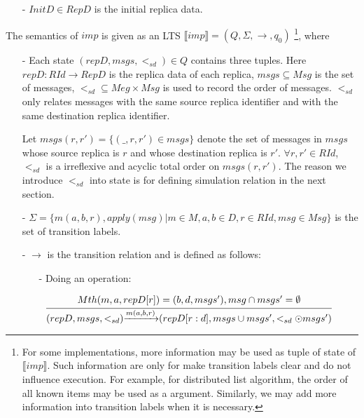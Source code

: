 {\begin{itemize}
\item[-] $InitD \in RepD$ is the initial replica data.
\end{itemize}

The semantics of $imp$ is given as an LTS $\llbracket imp \rrbracket = (Q,\Sigma,\rightarrow,q_0)$ \footnote{{\color {red} For some implementations, more information may be used as tuple of state of $\llbracket imp \rrbracket$. Such information are only for make transition labels clear and do not influence execution. For example, for distributed list algorithm, the order of all known items may be used as a argument. Similarly, we may add more information into transition labels when it is necessary.}}, where

\begin{itemize}
\setlength{\itemsep}{0.5pt}
\item[-] Each state $(repD,msgs,<_{sd}) \in Q$ contains three tuples. Here $repD: RId \rightarrow RepD$ is the replica data of each replica, $msgs \subseteq Msg$ is the set of messages, $<_{sd} \subseteq Meg \times Msg$ is used to record the order of messages. $<_{sd}$ only relates messages with the same source replica identifier and with the same destination replica identifier.

Let $msgs(r,r') = \{ (\_,r,r') \in msgs \}$ denote the set of messages in $msgs$ whose source replica is $r$ and whose destination replica is $r'$. $\forall r,r' \in RId$, $<_{sd}$ is a irreflexive and acyclic total order on $msgs(r,r')$. %
The reason we introduce $<_{sd}$ into state is for defining simulation relation in the next section.

\item[-] $\Sigma = \{ m(a,b,r), apply(msg) \vert m \in M, a,b \in D, r \in RId, msg \in Msg \}$ is the set of transition labels.

\item[-] $\rightarrow$ is the transition relation and is defined as follows:

    \begin{itemize}
    \setlength{\itemsep}{0.5pt}
    \item[-] Doing an operation:

    $\begin{array}{l c} \bigfrac{ Mth(m,a,repD[r]) = (b,d,msgs'), msg \cap msgs' = \emptyset} {(repD,msgs,<_{sd}) {\xrightarrow{m(a,b,r)}} (repD[r:d],msgs \cup msgs',<_{sd} \odot msgs')} \end{array}$


\end{itemize}
\end{itemize}}
